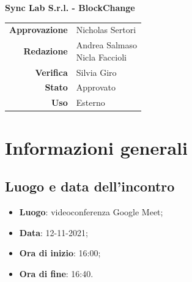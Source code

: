 \documentclass[11pt]{article}
\begin{document}
\begin{titlepage}
\begin{center}
			\large
			\textbf{Sync Lab S.r.l. - BlockChange}\\
			
			\vfill
			
			\begin{tabular}{r|l}
				\textbf{Approvazione} &  Nicholas Sertori\\
				\textbf{Redazione} &  \parbox[t]{3.5cm}{Andrea Salmaso \\Nicla Faccioli}\\
				\textbf{Verifica} &  Silvia Giro\\
				\textbf{Stato} & Approvato \\
				\textbf{Uso} & Esterno
			\end{tabular}
			\vfill
			
		\end{center}
	\end{titlepage}

	\newpage
	
	\section{Informazioni generali}
		\subsection{Luogo e data dell'incontro}
			\begin{itemize}
				\item \textbf{Luogo}: videoconferenza Google Meet;
				\item \textbf{Data}: 12-11-2021;
				\item \textbf{Ora di inizio}: 16:00;
				\item \textbf{Ora di fine}: 16:40.
			\end{itemize}
		
\end{document}
